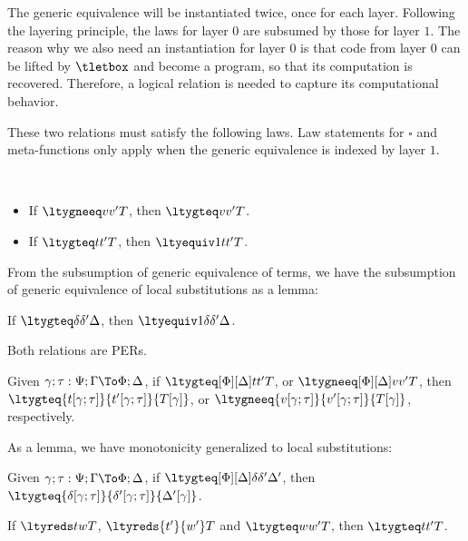 The generic equivalence will be instantiated twice, once for each layer. %
Following the layering principle, the laws for layer $0$ are subsumed by those for
layer $1$. %
The reason why we also need an instantiation for layer $0$ is that code from layer $0$
can be lifted by $\tletbox$ and become a program, so that its computation is
recovered. %
Therefore, a logical relation is needed to capture its computational behavior. %

These two relations must satisfy the following laws. %
Law statements for $\square$ and meta-functions only apply when the generic
equivalence is indexed by layer $1$. 

\begin{law}[Subsumption]$ $
  \begin{itemize}
  \item If $\ltygneeq v {v'} T$, then $\ltygteq v {v'} T$.
  \item If $\ltygteq t {t'} T$, then $\ltyequiv 1 t {t'} T$.
  \end{itemize}
\end{law}

From the subsumption of generic equivalence of terms, we have the subsumption of
generic equivalence of local substitutions as a lemma:
\begin{lemma}[Subsumption]
  If $\ltygteq \delta {\delta'} \Delta$, then $\ltyequiv 1 \delta {\delta'} \Delta$.  
\end{lemma}

\begin{law}[PER]
  Both relations are PERs. 
\end{law}

\begin{law}[Monotonicity]
  Given $\gamma; \tau : \Psi; \Gamma \To \Phi; \Delta$, if
  $\ltygteq[\Phi][\Delta] t {t'} T$, or $\ltygneeq[\Phi][\Delta] v {v'} T$, then
  $\ltygteq{t[\gamma;\tau]}{t'[\gamma;\tau]}{T[\gamma]}$, or
  $\ltygneeq{v[\gamma;\tau]}{v'[\gamma;\tau]}{T[\gamma]}$, respectively.
\end{law}

As a lemma, we have monotonicity generalized to local substitutions:
\begin{lemma}[Monotonicity]
  Given $\gamma; \tau : \Psi; \Gamma \To \Phi; \Delta$, if
  $\ltygteq[\Phi][\Delta] \delta {\delta'}{\Delta'}$, then
  $\ltygteq{\delta[\gamma;\tau]}{\delta'[\gamma;\tau]}{\Delta'[\gamma]}$.
\end{lemma}


\begin{law}
  If $\ltyreds t w T$, $\ltyreds{t'}{w'}T$ and $\ltygteq w {w'} T$, then $\ltygteq t {t'} T$.
\end{law}

